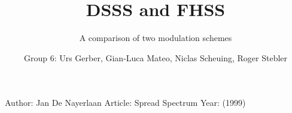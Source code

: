 \documentclass{llncs}
\begin{document}
\title{DSSS and FHSS}


\subtitle{A comparison of two modulation schemes}


\author{Group 6: Urs Gerber, Gian-Luca Mateo, Niclas Scheuing, Roger Stebler} 







\maketitle










%
%

\begin{thebibliography}{1}
Author: Jan De Nayerlaan
Article: Spread Spectrum
Year: (1999) 
\end{thebibliography}
\end{document}
